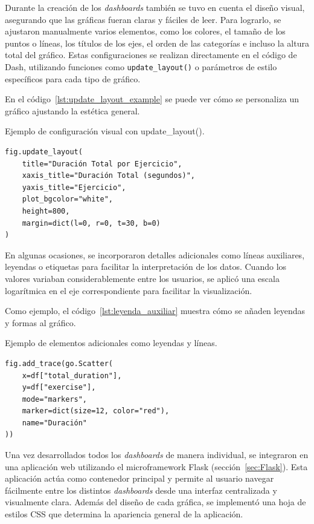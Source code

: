 \documentclass[a4paper, 12pt]{book}
\begin{document}
Durante la creación de los \textit{dashboards} también se tuvo en cuenta el diseño visual, asegurando que las gráficas fueran claras y fáciles de leer. Para lograrlo, se ajustaron manualmente varios elementos, como los colores, el tamaño de los puntos o líneas, los títulos de los ejes, el orden de las categorías e incluso la altura total del gráfico. Estas configuraciones se realizan directamente en el código de Dash, utilizando funciones como \texttt{update\_layout()} o parámetros de estilo específicos para cada tipo de gráfico.

En el código~\ref{lst:update_layout_example} se puede ver cómo se personaliza un gráfico ajustando la estética general.

\begin{listing}[h!]
\caption{Ejemplo de configuración visual con update\_layout().}
\label{lst:update_layout_example}
\begin{verbatim}
fig.update_layout(
    title="Duración Total por Ejercicio",
    xaxis_title="Duración Total (segundos)",
    yaxis_title="Ejercicio",
    plot_bgcolor="white",
    height=800,
    margin=dict(l=0, r=0, t=30, b=0)
)
\end{verbatim}
\end{listing}

En algunas ocasiones, se incorporaron detalles adicionales como líneas auxiliares, leyendas o etiquetas para facilitar la interpretación de los datos. Cuando los valores variaban considerablemente entre los usuarios, se aplicó una escala logarítmica en el eje correspondiente para facilitar la visualización.

Como ejemplo, el código~\ref{lst:leyenda_auxiliar} muestra cómo se añaden leyendas y formas al gráfico.

\begin{listing}[h!]
\caption{Ejemplo de elementos adicionales como leyendas y líneas.}
\label{lst:leyenda_auxiliar}
\begin{verbatim}
fig.add_trace(go.Scatter(
    x=df["total_duration"],
    y=df["exercise"],
    mode="markers",
    marker=dict(size=12, color="red"),
    name="Duración"
))
\end{verbatim}
\end{listing}

Una vez desarrollados todos los \textit{dashboards} de manera individual, se integraron en una aplicación web utilizando el microframework Flask (sección~\ref{sec:Flask}). Esta aplicación actúa como contenedor principal y permite al usuario navegar fácilmente entre los distintos \textit{dashboards} desde una interfaz centralizada y visualmente clara.  
Además del diseño de cada gráfica, se implementó una hoja de estilos CSS que determina la apariencia general de la aplicación.
\end{document}
